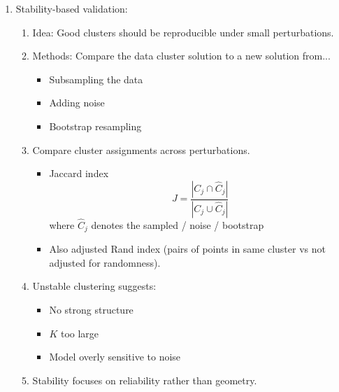 \documentclass{article}
\begin{document}
\begin{enumerate}
\begin{enumerate}
\item Silhouette score: measures how well each point fits within its assigned cluster compared to other clusters.
\begin{itemize}
\item For point $i$:
\[
a(i) = \text{ average distance to points in same cluster}
\]
\[
b(i) = \min_{k \neq c(i)} \text{ average distance to cluster $k$}
\]
\[
s(i) = \frac{b(i)-a(i)}{\max \{a(i), b(i) \}} \in [-1,1]
\]
\item $s \approx 1$: well-clustered
\item $s \approx 0$: ambiguous
\item $s < 0$: likely misclustered
\item Assumes distance-based, compact clusters, similar cluster density. Will penalize DBSCAN
\item Silhouette is an internal validation metric like $W$ and $B$, but it evaluates clustering locally at the point level rather than globally at the centroid level. Can average per cluster to get cluster metrics. Also average all for full clustering.
\end{itemize}
\end{enumerate}

\item Stability-based validation:
\begin{enumerate}
\item Idea: Good clusters should be reproducible under small perturbations.
\item Methods: Compare the data cluster solution to a new solution from...
\begin{itemize}
\item Subsampling the data
\item Adding noise
\item Bootstrap resampling
\end{itemize}
\item Compare cluster assignments across perturbations.
\begin{itemize}
\item Jaccard index
\[
J = \frac{|C_j \cap \hat{C}_j|}{|C_j \cup \hat{C}_j|}
\]
where $\hat{C}_j$ denotes the sampled / noise / bootstrap
\item Also adjusted Rand index (pairs of points in same cluster vs not adjusted for randomness).
\end{itemize}
\item Unstable clustering suggests:
\begin{itemize}
\item No strong structure
\item $K$ too large
\item Model overly sensitive to noise
\end{itemize}
\item Stability focuses on reliability rather than geometry.
\end{enumerate}


\end{enumerate}
\end{document}
